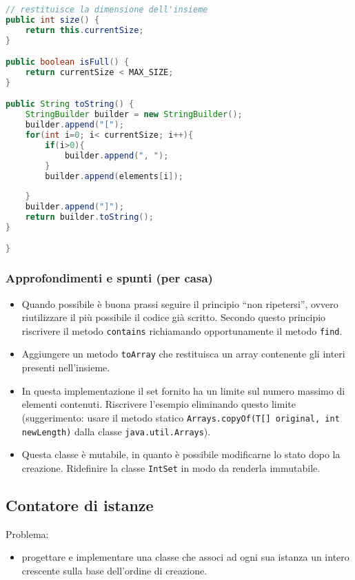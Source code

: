 \documentclass{article}
\begin{document}
\begin{lstlisting}[language=Java,escapechar=|]
// restituisce la dimensione dell'insieme
public int size() {
	return this.currentSize;
}

public boolean isFull() {
	return currentSize < MAX_SIZE;
}

public String toString() {
	StringBuilder builder = new StringBuilder();
	builder.append("[");
	for(int i=0; i< currentSize; i++){
		if(i>0){
			builder.append(", ");
		}
		builder.append(elements[i]);
		
	}
	builder.append("]");
	return builder.toString();
}

}
\end{lstlisting}

\subsubsection{Approfondimenti e spunti (per casa)}
\begin{itemize}
	\item Quando possibile è buona prassi seguire il principio ``non ripetersi'', ovvero riutilizzare il più possibile il codice già scritto.
	Secondo questo principio riscrivere il metodo \texttt{contains}
	richiamando opportunamente il metodo \texttt{find}.
	\item Aggiungere un metodo \texttt{toArray} che restituisca un array contenente gli interi presenti nell'insieme.
	\item In questa implementazione il set fornito ha un limite
	sul numero massimo di elementi contenuti.
	Riscrivere l'esempio eliminando questo limite (suggerimento:
	usare il metodo statico \texttt{Arrays.copyOf(T[] original, int newLength)} dalla classe \texttt{java.util.Arrays}).
	\item Questa classe è mutabile, in quanto è possibile modificarne lo stato dopo la creazione. Ridefinire la classe \texttt{IntSet}
	in modo da renderla immutabile.	
\end{itemize}

\subsection{Contatore di istanze}

Problema:

\begin{itemize}
	\item  progettare e implementare una classe che associ ad ogni sua istanza un intero crescente sulla base dell'ordine di creazione.
\end{itemize}
\end{document}

